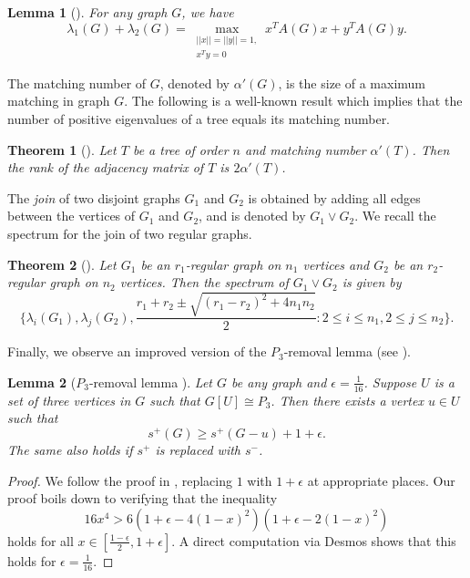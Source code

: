 \documentclass{article}
\newtheorem{theorem}{Theorem}[section]
\newtheorem{lemma}{Lemma}[section]
\begin{document}
\begin{lemma}[\cite{Mohar_2008}]\label{lemma:spectral_sum}
For any graph $G$, we have
    \[\lambda_1(G) + \lambda_2(G) = \max_{\substack{||x||=||y||=1,\\ x^Ty = 0}} x^TA(G)x + y^TA(G)y.\]
\end{lemma}

The matching number of $G$, denoted by $\alpha'(G)$, is the size of a maximum matching in graph $G$. The following is a well-known result which implies that the number of positive eigenvalues of a tree equals its matching number. 

\begin{theorem}[\cite{Cvetkovic_Gutman_1972}]\label{thm:tree_matching}
Let $T$ be a tree of order $n$ and matching number $\alpha'(T)$. Then the rank of the adjacency matrix of $T$ is $2\alpha'(T)$.
\end{theorem}

The \emph{join} of two disjoint graphs $G_1$ and $G_2$ is obtained by adding all edges between the vertices of $G_1$ and $G_2$, and is denoted by $G_1\vee G_2$. We recall the spectrum for the join of two regular graphs.

\begin{theorem}[\cite{barik_op_spec}]\label{thm:join_spectrum}
Let $G_1$ be an $r_1$-regular graph on $n_1$ vertices and $G_2$ be an $r_2$-regular graph on $n_2$ vertices. Then the spectrum of $G_1\lor G_2$ is given by
\[\bigg\{\lambda_i(G_1), \lambda_j(G_2), \frac{r_1+r_2 \pm \sqrt{(r_1 - r_2)^2+4n_1n_2}}{2} : 2\le i \le n_1, 2\le j\le n_2\bigg\}.\]
\end{theorem}

Finally, we observe an improved version of the $P_3$-removal lemma (see \cite[Theorem 1.10]{Zhang_2024_Extremal}). 

\begin{lemma}[$P_3$-removal lemma \cite{Zhang_2024_Extremal}] \label{lemma:P3_lemma}
Let $G$ be any graph and $\epsilon = \frac{1}{16}$. Suppose $U$ is a set of three vertices in $G$ such that $G[U]\cong P_3$. Then there exists a vertex $u \in U$ such that 
\[s^+(G) \geq s^+(G-u) + 1 + \epsilon.\]
The same also holds if $s^+$ is replaced with $s^-$.
\end{lemma}

\begin{proof}
We follow the proof in \cite[Section 4]{Zhang_2024_Extremal}, replacing $1$ with $1 + \epsilon$ at appropriate places. Our proof boils down to verifying that the inequality
\[16 x^4 > 6\left(1 + \epsilon - 4(1 - x)^2\right) \left(1 + \epsilon - 2(1 - x)^2\right)\]
holds for all $x \in \left[\frac{1 - \epsilon}{2}, 1 + \epsilon\right]$. A direct computation via Desmos shows that this holds for $\epsilon = \frac{1}{16}$.
\end{proof}
\end{document}
